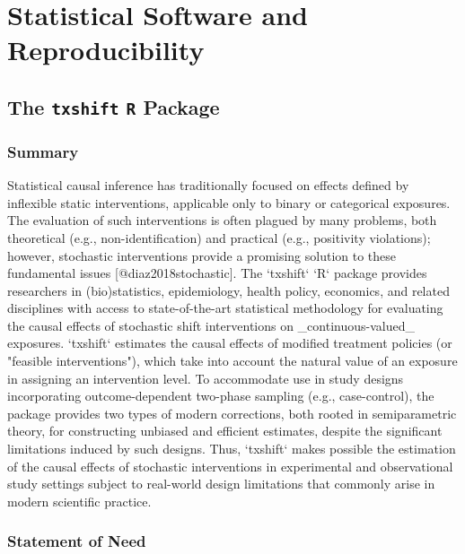 \chapter{Statistical Software and Reproducibility}

\section{The \texttt{txshift} \texttt{R} Package}

\subsection{Summary}

Statistical causal inference has traditionally focused on effects defined by
inflexible static interventions, applicable only to binary or categorical
exposures. The evaluation of such interventions is often plagued by many
problems, both theoretical (e.g., non-identification) and practical (e.g.,
positivity violations); however, stochastic interventions provide a promising
solution to these fundamental issues [@diaz2018stochastic]. The `txshift` `R`
package provides researchers in (bio)statistics, epidemiology, health policy,
economics, and related disciplines with access to state-of-the-art statistical
methodology for evaluating the causal effects of stochastic shift interventions
on _continuous-valued_ exposures. `txshift` estimates the causal effects of
modified treatment policies (or "feasible interventions"), which take into
account the natural value of an exposure in assigning an intervention level. To
accommodate use in study designs incorporating outcome-dependent two-phase
sampling (e.g., case-control), the package provides two types of modern
corrections, both rooted in semiparametric theory, for constructing unbiased and
efficient estimates, despite the significant limitations induced by such
designs. Thus, `txshift` makes possible the estimation of the causal effects of
stochastic interventions in experimental and observational study settings
subject to real-world design limitations that commonly arise in modern
scientific practice.

\subsection{Statement of Need}

